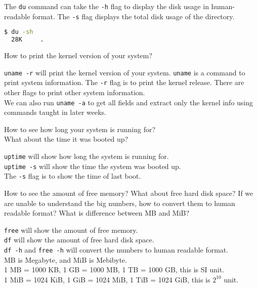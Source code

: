 The \texttt{du} command can take the \texttt{-h} flag to display the disk usage in human-readable format.
The \texttt{-s} flag displays the total disk usage of the directory.

\begin{lstlisting}[language=bash]
  $ du -sh
  28K     .
\end{lstlisting}


\begin{qs}
  How to print the kernel version of your system?
\end{qs}

\begin{ans}
  \texttt{uname -r} will print the kernel version of your system.
  \texttt{uname} is a command to print system information.
  The \texttt{-r} flag is to print the kernel release.
  There are other flags to print other system information. \\
  We can also run \texttt{uname -a} to get all fields and extract only the
  kernel info using commands taught in later weeks.
\end{ans}

\begin{qs}
  How to see how long your system is running for? \\
  What about the time it was booted up?
\end{qs}

\begin{ans}
  \texttt{uptime} will show how long the system is running for.\\
  \texttt{uptime -s} will show the time the system was booted up. \\
  The \texttt{-s} flag is to show the time of last boot.
\end{ans}

\begin{qs}
  How to see the amount of free memory? What about free hard disk space?
  If we are unable to understand the big numbers, how to convert them to human readable format?
  What is difference between MB and MiB?
\end{qs}

\begin{ans}
  \texttt{free} will show the amount of free memory. \\
  \texttt{df} will show the amount of free hard disk space. \\
  \texttt{df -h} and \texttt{free -h}
  will convert the numbers to human readable format. \\
  MB is Megabyte, and MiB is Mebibyte. \\
  1 MB = 1000 KB, 1 GB = 1000 MB, 1 TB = 1000 GB, this is SI unit. \\
  1 MiB = 1024 KiB, 1 GiB = 1024 MiB, 1 TiB = 1024 GiB, this is $2^{10}$ unit.
\end{ans}


